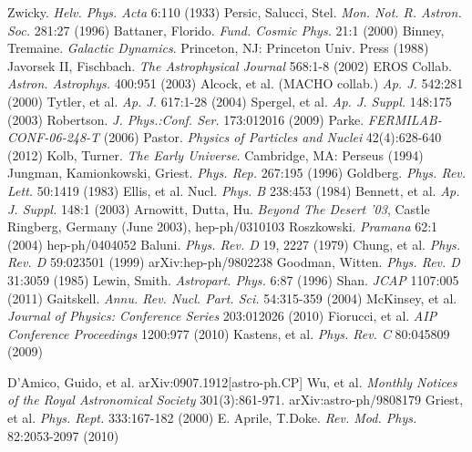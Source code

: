\documentclass[a4paper,12pt]{article}
\begin{document}
\begin{thebibliography}{1}

 Zwicky.  \emph{Helv. Phys. Acta} 6:110 (1933)
 Persic, Salucci, Stel.  \emph{Mon. Not. R. Astron. Soc.} 281:27 (1996)
 Battaner, Florido.  \emph{Fund. Cosmic Phys.} 21:1 (2000)
 Binney, Tremaine. \emph{Galactic Dynamics}. Princeton, NJ: Princeton Univ. Press (1988)
 Javorsek II, Fischbach. \emph{The Astrophysical Journal} 568:1-8 (2002)
 EROS Collab.  \emph{Astron. Astrophys.} 400:951 (2003)
 Alcock, et al. (MACHO collab.)  \emph{Ap. J.} 542:281 (2000)
 Tytler, et al. \emph{Ap. J.} 617:1-28 (2004)
 Spergel, et al. \emph{Ap. J. Suppl.} 148:175 (2003)
 Robertson. \emph{J. Phys.:Conf. Ser.} 173:012016 (2009)
 Parke.  \emph{FERMILAB-CONF-06-248-T} (2006)
 Pastor.  \emph{Physics of Particles and Nuclei} 42(4):628-640 (2012)
 Kolb, Turner. \emph{The Early Universe}.  Cambridge, MA: Perseus (1994)
 Jungman, Kamionkowski, Griest.  \emph{Phys. Rep.} 267:195 (1996)
 Goldberg.  \emph{Phys. Rev. Lett.} 50:1419 (1983)
 Ellis, et al. Nucl. \emph{Phys. B} 238:453 (1984)
 Bennett, et al. \emph{Ap. J. Suppl.} 148:1 (2003)
 Arnowitt, Dutta, Hu. \emph{Beyond The Desert '03}, Castle Ringberg, Germany (June 2003), hep-ph/0310103
 Roszkowski.  \emph{Pramana} 62:1 (2004) hep-ph/0404052
 Baluni. \emph{Phys. Rev. D} 19, 2227 (1979)
 Chung, et al.  \emph{Phys. Rev. D} 59:023501 (1999) arXiv:hep-ph/9802238
 Goodman, Witten. \emph{Phys. Rev. D} 31:3059 (1985)
 Lewin, Smith. \emph{Astropart. Phys.} 6:87 (1996)
 Shan. \emph{JCAP} 1107:005 (2011)
 Gaitskell.  \emph{Annu. Rev. Nucl. Part. Sci.} 54:315-359 (2004)
 McKinsey, et al.  \emph{Journal of Physics: Conference Series} 203:012026 (2010) 
 Fiorucci, et al.  \emph{AIP Conference Proceedings} 1200:977 (2010)
 Kastens, et al. \emph{Phys. Rev. C} 80:045809 (2009)

 D'Amico, Guido, et al. arXiv:0907.1912[astro-ph.CP] 
 Wu, et al.  \emph{Monthly Notices of the Royal Astronomical Society} 301(3):861-971.  arXiv:astro-ph/9808179
 Griest, et al.  \emph{Phys. Rept.} 333:167-182 (2000) 
 E. Aprile, T.Doke. \emph{Rev. Mod. Phys.} 82:2053-2097 (2010)


\end{thebibliography}
\end{document}
